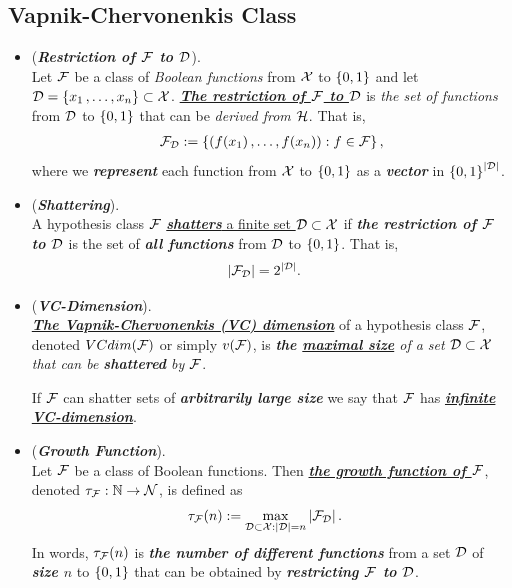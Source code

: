 \documentclass[11pt]{article}
\begin{document}
\subsection{Vapnik-Chervonenkis Class}
\begin{itemize}
\item \begin{definition} (\emph{\textbf{Restriction of ${\mathcal F}$ to ${\mathcal D}$}}). \\
Let ${\mathcal F}$ be a class of \emph{Boolean functions} from ${\mathcal X}$ to $\left\{0,1\right\}$ and let ${\mathcal D} = \left\{x_1 \,{,}\ldots{,}\, x_n\right\} \subset {\mathcal X}$. 
\underline{\emph{\textbf{The restriction of ${\mathcal F}$ to ${\mathcal D}$}}} is \emph{the set of functions} from ${\mathcal D}$ to $\left\{0,1\right\}$ that can be \emph{derived from} ${\mathcal H}$. That is,
\begin{align*}
{\mathcal F}_{{\mathcal D}} := \left\{(f(x_1) \,{,}\ldots{,}\, f(x_n)): f \in {\mathcal F}\right\},
\end{align*}
where we \emph{\textbf{represent}} each function from ${\mathcal X}$ to $\left\{0,1\right\}$ as a \emph{\textbf{vector}} in $\left\{0,1\right\}^{\left\lvert {\mathcal D} \right\rvert}$.
\end{definition}

\item \begin{definition}(\emph{\textbf{Shattering}}). \\
A hypothesis class ${\mathcal F}$ \underline{\emph{\textbf{shatters}} a finite set ${\mathcal D} \subset {\mathcal X}$} if \emph{\textbf{the restriction of ${\mathcal F}$ to ${\mathcal D}$}} is the set of \emph{\textbf{all functions}} from ${\mathcal D}$ to $\left\{0,1\right\}$. That is, 
\begin{align*}
\left\lvert {\mathcal F}_{{\mathcal D}} \right\rvert &= 2^{\left\lvert {\mathcal D} \right\rvert}.
\end{align*}
\end{definition}

\item \begin{definition} (\emph{\textbf{VC-Dimension}}). \\
\underline{\emph{\textbf{The Vapnik-Chervonenkis (VC) dimension}}} of a hypothesis class ${\mathcal F}$, denoted $VCdim({\mathcal F})$ or simply $v({\mathcal F})$, is \emph{\textbf{the \underline{maximal size}} of a set ${\mathcal D} \subset {\mathcal X}$ that can be \textbf{shattered} by ${\mathcal F}$}.

If ${\mathcal F}$ can shatter sets of \emph{\textbf{arbitrarily large size}} we say that ${\mathcal F}$ has \underline{\emph{\textbf{infinite VC-dimension}}}.
\end{definition}

\item \begin{definition} (\emph{\textbf{Growth Function}}). \\
Let ${\mathcal F}$ be a class of Boolean functions. Then \underline{\emph{\textbf{the growth function of ${\mathcal F}$}}}, denoted $\tau_{{\mathcal F}}: {\mathbb N} \to {\mathcal N}$, is defined as
\begin{align*}
\tau_{{\mathcal F}}(n) &:= \max_{{\mathcal D} \subset {\mathcal X}: \left\lvert {\mathcal D} \right\rvert = n}\left\lvert {\mathcal F}_{{\mathcal D}} \right\rvert.
\end{align*}
In words, $\tau_{{\mathcal F}}(n)$ is \textbf{\emph{the number of different functions}} from a set ${\mathcal D}$ of \emph{\textbf{size $n$}} to $\left\{0,1\right\}$ that can be obtained by \emph{\textbf{restricting ${\mathcal F}$ to ${\mathcal D}$}}.
\end{definition}


\end{itemize}
\end{document}
